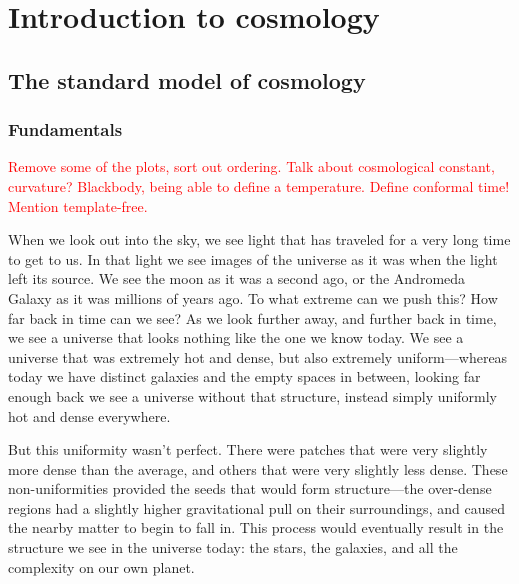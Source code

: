 %
\chapter{Introduction to cosmology}\label{chapter:intro_general}
\section{The standard model of cosmology}\label{sec:general_intro}
    \subsection{Fundamentals}
\textcolor{red}{Remove some of the plots, sort out ordering. Talk about cosmological constant, curvature?
Blackbody, being able to define a temperature. Define conformal time!
Mention template-free.}


When we look out into the sky, we see light that has traveled for a very long time to get to us.
In that light we see images of the universe as it was when the light left its source.
We see the moon as it was a second ago, or the Andromeda Galaxy as it was millions of
years ago. To what extreme can we push this? How far back in time can we see? As we look further
away, and further back in time, we see a universe that looks nothing like the one we know today.
We see a universe that was extremely hot and dense, but also extremely uniform---whereas today
we have distinct galaxies and the empty spaces in between, looking far enough back we see a universe
without that structure, instead simply uniformly hot and dense everywhere.


But this uniformity wasn't perfect. There were patches that were very slightly more dense than the average,
and others that were very slightly less dense. These non-uniformities provided the seeds that would form
structure---the over-dense regions had a slightly higher gravitational pull on their surroundings,
and caused the nearby matter to begin to fall in. This process would eventually result in the structure
we see in the universe today: the stars, the galaxies, and all the complexity on our own planet.


